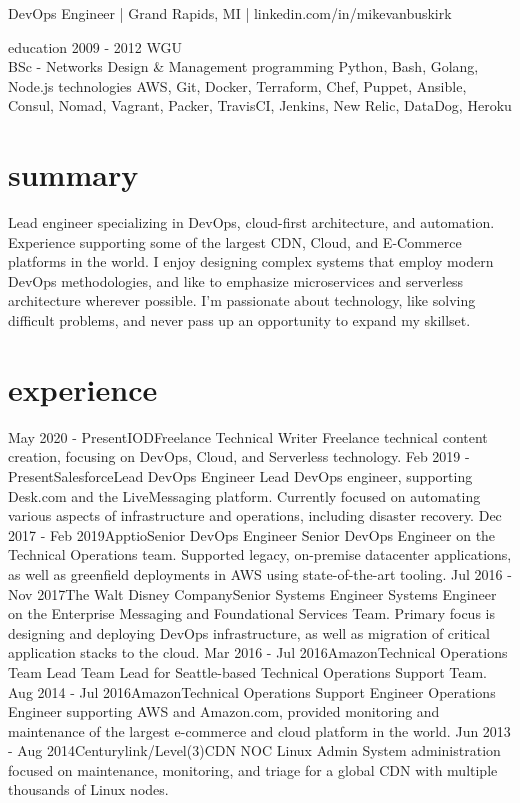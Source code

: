 \documentclass[]{mv_cv}
\begin{document}
       {DevOps Engineer | Grand Rapids, MI | linkedin.com/in/mikevanbuskirk} 
 
\begin{sidebar}
 \sideitem
 {education}
 {2009 - 2012 WGU\\BSc - Networks Design \& Management}
 \sideitem
 {programming}
 {Python, Bash, Golang, Node.js}
 \sideitem
 {technologies}
 {AWS, Git, Docker,
 Terraform, Chef,
 Puppet, Ansible,
 Consul, Nomad,
 Vagrant, Packer,
 TravisCI, Jenkins,
 New Relic, DataDog, Heroku}
\end{sidebar}

\section{summary}
\begin{content}
  {Lead engineer specializing in DevOps, cloud-first architecture, and automation.
  Experience supporting some of the largest CDN, Cloud, and E-Commerce platforms in the world.
  I enjoy designing complex systems that employ modern DevOps methodologies, and like to emphasize microservices and serverless architecture wherever possible.
  I'm passionate about technology, like solving difficult problems, and never pass up an opportunity to expand my skillset.}
\end{content}

\section{experience}
  \begin{explist}
    \expitem
    {May 2020 - Present}{IOD}{Freelance Technical Writer}
    {Freelance technical content creation, focusing on DevOps, Cloud, and Serverless technology.}
    \expitem
    {Feb 2019 - Present}{Salesforce}{Lead DevOps Engineer}
    {Lead DevOps engineer, supporting Desk.com and the LiveMessaging platform. Currently focused on automating various aspects of infrastructure and operations, including disaster recovery.}
    \expitem
    {Dec 2017 - Feb 2019}{Apptio}{Senior DevOps Engineer}
    {Senior DevOps Engineer on the Technical Operations team. Supported legacy, on-premise datacenter applications, as well as greenfield deployments in AWS using state-of-the-art tooling.}
    \expitem
    {Jul 2016 - Nov 2017}{The Walt Disney Company}{Senior Systems Engineer}
    {Systems Engineer on the Enterprise Messaging and Foundational Services Team. Primary focus is designing and deploying DevOps infrastructure, as well as migration of critical application stacks to the cloud.}
    \expitem
    {Mar 2016 - Jul 2016}{Amazon}{Technical Operations Team Lead}
    {Team Lead for Seattle-based Technical Operations Support Team.}
    \expitem
    {Aug 2014 - Jul 2016}{Amazon}{Technical Operations Support Engineer}
    {Operations Engineer supporting AWS and Amazon.com, provided monitoring and maintenance of the largest e-commerce and cloud platform in the world.}
   \expitem
    {Jun 2013 - Aug 2014}{Centurylink/Level(3)}{CDN NOC Linux Admin}
    {System administration focused on maintenance, monitoring, and triage for a global CDN with multiple thousands of Linux nodes.}
  \end{explist}

\thispagestyle{empty}
\end{document}
